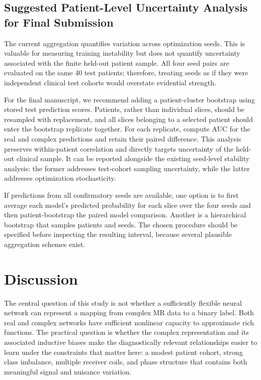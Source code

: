 \documentclass[journal]{IEEEtran}
\begin{document}
\subsection{Suggested Patient-Level Uncertainty Analysis for Final Submission}
The current aggregation quantifies variation across optimization seeds. This is valuable for measuring training instability but does not quantify uncertainty associated with the finite held-out patient sample. All four seed pairs are evaluated on the same 40 test patients; therefore, treating seeds as if they were independent clinical test cohorts would overstate evidential strength.

For the final manuscript, we recommend adding a patient-cluster bootstrap using stored test prediction scores. Patients, rather than individual slices, should be resampled with replacement, and all slices belonging to a selected patient should enter the bootstrap replicate together. For each replicate, compute AUC for the real and complex predictions and retain their paired difference. This analysis preserves within-patient correlation and directly targets uncertainty of the held-out clinical sample. It can be reported alongside the existing seed-level stability analysis: the former addresses test-cohort sampling uncertainty, while the latter addresses optimization stochasticity.

If predictions from all confirmatory seeds are available, one option is to first average each model's predicted probability for each slice over the four seeds and then patient-bootstrap the paired model comparison. Another is a hierarchical bootstrap that samples patients and seeds. The chosen procedure should be specified before inspecting the resulting interval, because several plausible aggregation schemes exist.

\section{Discussion}\label{sec:discussion}
The central question of this study is not whether a sufficiently flexible neural network can represent a mapping from complex MR data to a binary label. Both real and complex networks have sufficient nonlinear capacity to approximate rich functions. The practical question is whether the complex representation and its associated inductive biases make the diagnostically relevant relationships easier to learn under the constraints that matter here: a modest patient cohort, strong class imbalance, multiple receiver coils, and phase structure that contains both meaningful signal and nuisance variation.
\end{document}
